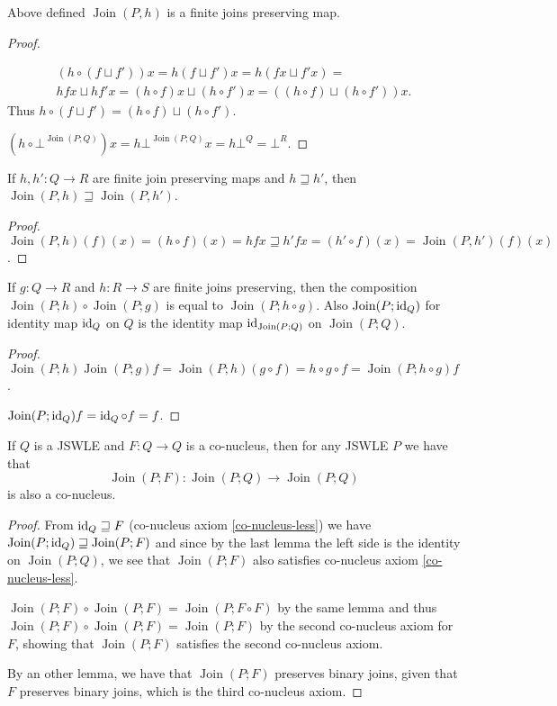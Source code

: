 \begin{lem}
Above defined $\operatorname{Join}(P,h)$ is a finite joins preserving
map.\end{lem}
\begin{proof}
~

\begin{multline*}
(h\circ(f\sqcup f'))x=h(f\sqcup f')x=h(fx\sqcup f'x)=\\
hfx\sqcup hf'x=(h\circ f)x\sqcup(h\circ f')x=((h\circ f)\sqcup(h\circ f'))x.
\end{multline*}
Thus $h\circ(f\sqcup f')=(h\circ f)\sqcup(h\circ f')$.

$(h\circ\bot^{\operatorname{Join}(P;Q)})x=h\bot^{\operatorname{Join}(P;Q)}x=h\bot^Q=\bot^R$.\end{proof}
\begin{prop}
If $h,h':Q\rightarrow R$ are finite join preserving maps and $h\sqsupseteq h'$,
then $\operatorname{Join}(P,h)\sqsupseteq\operatorname{Join}(P,h')$.\end{prop}
\begin{proof}
$\operatorname{Join}(P,h)(f)(x)=(h\circ f)(x)=hfx\sqsupseteq h'fx=(h'\circ f)(x)=\operatorname{Join}(P,h')(f)(x)$.\end{proof}
\begin{lem}
If $g:Q\rightarrow R$ and $h:R\rightarrow S$ are finite joins preserving,
then the composition $\operatorname{Join}(P;h)\circ\operatorname{Join}(P;g)$
is equal to $\operatorname{Join}(P;h\circ g)$. Also $\operatorname{Join}(P;\operatorname{id}_{Q})$
for identity map $\operatorname{id}_{Q}$ on $Q$ is the identity map $\operatorname{id}_{\operatorname{Join}(P;Q)}$
on $\operatorname{Join}(P;Q)$.\end{lem}
\begin{proof}
$\operatorname{Join}(P;h)\operatorname{Join}(P;g)f=\operatorname{Join}(P;h)(g\circ f)=h\circ g\circ f=\operatorname{Join}(P;h\circ g)f$.

$\operatorname{Join}(P;\operatorname{id}_{Q})f=\operatorname{id}_{Q}\circ f=f$.\end{proof}
\begin{cor}
\label{join-map-co-nucleus}If $Q$ is a JSWLE and $F:Q\rightarrow Q$
is a co-nucleus, then for any JSWLE $P$ we have that 
\[
\operatorname{Join}(P;F):\operatorname{Join}(P;Q)\rightarrow\operatorname{Join}(P;Q)
\]
 is also a co-nucleus.\end{cor}
\begin{proof}
From $\operatorname{id}_{Q}\sqsupseteq F$ (co-nucleus axiom \ref{co-nucleus-less})
we have $\operatorname{Join}(P;\operatorname{id}_{Q})\sqsupseteq\operatorname{Join}(P;F)$
and since by the last lemma the left side is the identity on $\operatorname{Join}(P;Q)$,
we see that $\operatorname{Join}(P;F)$ also satisfies co-nucleus
axiom \ref{co-nucleus-less}.

$\operatorname{Join}(P;F)\circ\operatorname{Join}(P;F)=\operatorname{Join}(P;F\circ F)$
by the same lemma and thus $\operatorname{Join}(P;F)\circ\operatorname{Join}(P;F)=\operatorname{Join}(P;F)$
by the second co-nucleus axiom for $F$, showing that $\operatorname{Join}(P;F)$
satisfies the second co-nucleus axiom.

By an other lemma, we have that $\operatorname{Join}(P;F)$ preserves
binary joins, given that $F$ preserves binary joins, which is the
third co-nucleus axiom.\end{proof}
